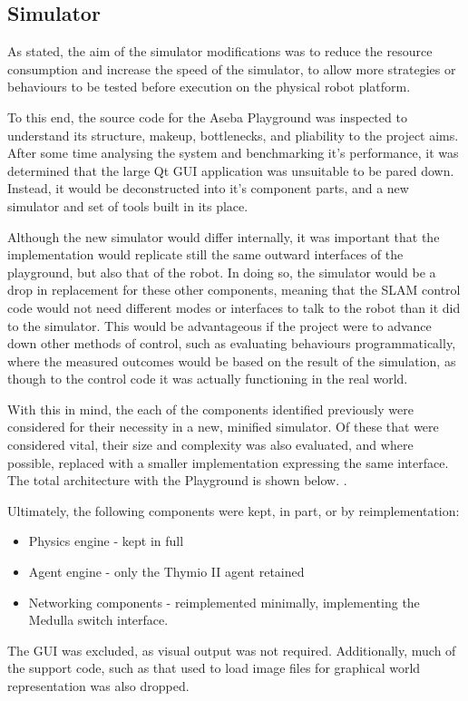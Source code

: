 \subsection{Simulator}
As stated, the aim of the simulator modifications was to reduce the resource
consumption and increase the speed of the simulator, to allow more strategies
or behaviours to be tested before execution on the physical robot platform.

To this end, the source code for the Aseba Playground was inspected to
understand its structure, makeup, bottlenecks, and pliability to the project
aims. After some time analysing the system and benchmarking it's performance,
it was determined that the large Qt GUI application was unsuitable to be pared
down. Instead, it would be deconstructed into it's component parts, and a new
simulator and set of tools built in its place.

Although the new simulator would differ internally, it was important that the
implementation would replicate still the same outward interfaces of the
playground, but also that of the robot. In doing so, the simulator would be a
drop in replacement for these other components, meaning that the SLAM control
code would not need different modes or interfaces to talk to the robot than it
did to the simulator. This would be advantageous if the project were to advance
down other methods of control, such as evaluating behaviours programmatically,
where the measured outcomes would be based on the result of the simulation, as
though to the control code it was actually functioning in the real world.

With this in mind, the each of the components identified previously were
considered for their necessity in a new, minified simulator. Of these that were
considered vital, their size and complexity was also evaluated, and where
possible, replaced with a smaller implementation expressing the same interface.
The total architecture with the Playground is shown below. .

Ultimately, the following components were kept, in part, or by reimplementation:
\begin{itemize}
    \item Physics engine - kept in full
    \item Agent engine - only the Thymio II agent retained
    \item Networking components - reimplemented minimally, implementing the
        Medulla switch interface.
\end{itemize}
The GUI was excluded, as visual output was not required. Additionally, much of
the support code, such as that used to load image files for graphical world
representation was also dropped.

